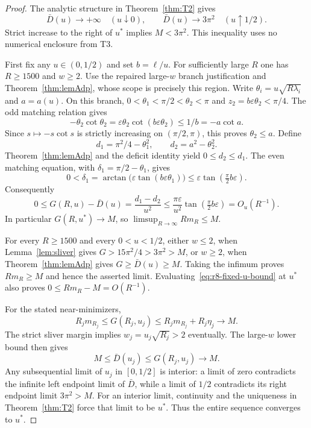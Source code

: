 \begin{proof}
The analytic structure in Theorem~\ref{thm:T2} gives
\[
 \bar D(u)\longrightarrow+\infty\quad(u\downarrow0),
 \qquad
 \bar D(u)\longrightarrow3\pi^2\quad(u\uparrow1/2).
\]
Strict increase to the right of $u^*$ implies $M<3\pi^2$.
This inequality uses no numerical enclosure from T3.

First fix any $u\in(0,1/2)$ and set $b=\ell/u$.
For sufficiently large $R$ one has $R\ge1500$ and $w\ge2$.
Use the repaired large-$w$ branch justification and
Theorem~\ref{thm:lemAdp}, whose scope is precisely this region.
Write $\theta_i=u\sqrt{R\lambda_i}$ and $a=a(u)$.
On this branch, $0<\theta_1<\pi/2<\theta_2<\pi$ and
$z_2=b\varepsilon\theta_2<\pi/4$.
The odd matching relation gives
\[
 -\theta_2\cot\theta_2
 =\varepsilon\theta_2\cot(b\varepsilon\theta_2)
 \le 1/b=-a\cot a.
\]
Since $s\mapsto-s\cot s$ is strictly increasing on $(\pi/2,\pi)$,
this proves $\theta_2\le a$. Define
\[
 d_1=\pi^2/4-\theta_1^2,
 \qquad d_2=a^2-\theta_2^2.
\]
Theorem~\ref{thm:lemAdp} and the deficit identity yield
$0\le d_2\le d_1$.
The even matching equation, with $\delta_1=\pi/2-\theta_1$, gives
\[
 0<\delta_1
 =\arctan\bigl(\varepsilon\tan(b\varepsilon\theta_1)\bigr)
 \le\varepsilon\tan(\tfrac\pi2 b\varepsilon).
\]
Consequently
\begin{equation}
 0\le G(R,u)-\bar D(u)
 =\frac{d_1-d_2}{u^2}
 \le\frac{\pi\varepsilon}{u^2}
       \tan(\tfrac\pi2 b\varepsilon)
 =O_u(R^{-1}).
 \label{eq:r8-fixed-u-bound}
\end{equation}
In particular $G(R,u^*)\to M$, so
$\limsup_{R\to\infty}Rm_R\le M$.

For every $R\ge1500$ and every $0<u<1/2$, either $w\le2$, when
Lemma~\ref{lem:sliver} gives $G>15\pi^2/4>3\pi^2>M$, or $w\ge2$,
when Theorem~\ref{thm:lemAdp} gives $G\ge\bar D(u)\ge M$.
Taking the infimum proves $Rm_R\ge M$ and hence the asserted limit.
Evaluating~\eqref{eq:r8-fixed-u-bound} at $u^*$ also proves
$0\le Rm_R-M=O(R^{-1})$.

For the stated near-minimizers,
\[
 R_jm_{R_j}\le G(R_j,u_j)
 \le R_jm_{R_j}+R_j\eta_j\longrightarrow M.
\]
The strict sliver margin implies $w_j=u_j\sqrt{R_j}>2$ eventually.
The large-$w$ lower bound then gives
\[
 M\le\bar D(u_j)\le G(R_j,u_j)\longrightarrow M.
\]
Any subsequential limit of $u_j$ in $[0,1/2]$ is interior:
a limit of zero contradicts the infinite left endpoint limit of
$\bar D$, while a limit of $1/2$ contradicts its right endpoint limit
$3\pi^2>M$. For an interior limit, continuity and the uniqueness in
Theorem~\ref{thm:T2} force that limit to be $u^*$.
Thus the entire sequence converges to $u^*$.
\end{proof}

